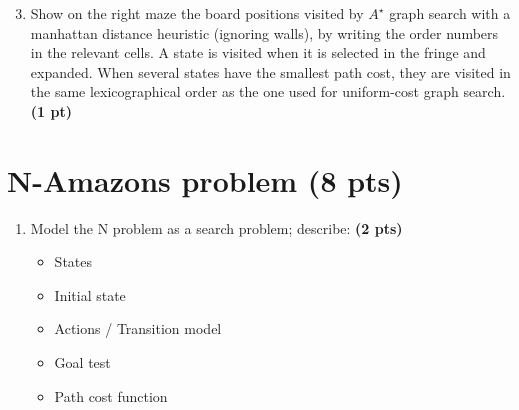\documentclass[11pt,a4paper]{report}
\begin{document}
\begin{enumerate}
\setcounter{enumi}{2}
\item Show on the right maze the board positions visited by $A^{\star}$ graph search with a manhattan distance heuristic (ignoring walls), by writing the order numbers in the relevant cells. A state is visited when it is selected in the fringe and expanded. When several states have the smallest path cost, they are visited in the same lexicographical order as the one used for uniform-cost graph search. \textbf{(1 pt)}
\end{enumerate}

\begin{answers}[5.2cm]
\begin{center}
\end{center}
\end{answers}




\section{N-Amazons problem (8 pts)}

\begin{enumerate}
  \item Model the N problem as a search problem; describe: \textbf{(2 pts)}
		\begin{itemize}
			\item States
			\item Initial state
			\item Actions / Transition model
			\item Goal test
			\item Path cost function
		\end{itemize}
\end{enumerate}
\end{document}
